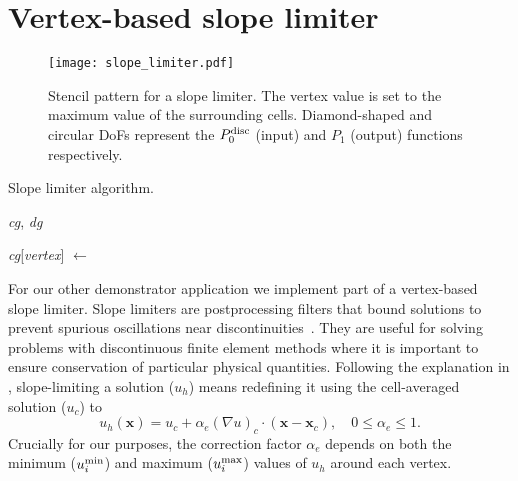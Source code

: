 \documentclass[thesis]{subfiles}
\begin{document}




\section{Vertex-based slope limiter}

\begin{figure}
  \centering
  \texttt{[image: slope\_limiter.pdf]}
  \caption{
    Stencil pattern for a slope limiter.
    The vertex value is set to the maximum value of the surrounding cells.
    Diamond-shaped and circular DoFs represent the $P_0^\textnormal{disc}$ (input) and $P_1$ (output) functions respectively.
  }
  \label{fig:slope_limiter_stencil}
\end{figure}

\begin{algorithm}
  \caption{
    Slope limiter algorithm.
  }
  \begin{algorithmic}[1]
    \Require \textit{cg}, \textit{dg} 

       
        \State \textit{cg}[\textit{vertex}] $\gets$ 
      \EndFor
    \EndFor
  \end{algorithmic}
  \label{alg:slope_limiter}
\end{algorithm}

For our other demonstrator application we implement part of a vertex-based slope limiter.
Slope limiters are postprocessing filters that bound solutions to prevent spurious oscillations near discontinuities~\cite{biswasParallelAdaptiveFinite1994}.
They are useful for solving problems with discontinuous finite element methods where it is important to ensure conservation of particular physical quantities.
Following the explanation in \cite{kuzminVertexbasedHierarchicalSlope2010}, slope-limiting a solution ($u_h$) means redefining it using the cell-averaged solution ($u_c$) to
\begin{equation}
  u_h(\mathbf{x}) = u_c + \alpha_e(\nabla u)_c \cdot (\mathbf{x} - \mathbf{x}_c), \quad 0 \leq \alpha_e \leq 1 .
\end{equation}
Crucially for our purposes, the correction factor $\alpha_e$ depends on both the minimum ($u_i^{\textnormal{min}}$) and maximum ($u_i^{\textnormal{max}}$) values of $u_h$ around each vertex.
\end{document}
